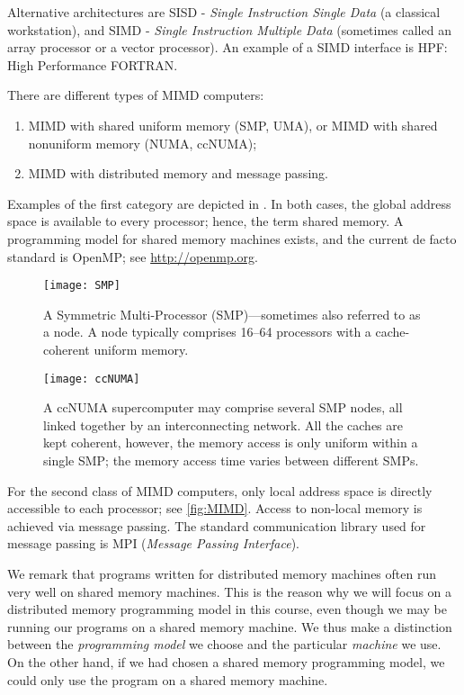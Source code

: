 Alternative architectures are SISD - \emph{Single Instruction Single Data} (a
classical workstation), and SIMD - \emph{Single Instruction Multiple Data}
(sometimes called an array processor or a vector processor). An example of a
SIMD interface is HPF: High Performance FORTRAN.

There are different types of MIMD computers:
\begin{enumerate}
\item MIMD with shared uniform memory (SMP, UMA), or MIMD with shared nonuniform
  memory (NUMA, ccNUMA);
\item MIMD with distributed memory and message passing.
\end{enumerate}

Examples of the first category are depicted in . In
both cases, the global address space is available to every processor; hence, the
term shared memory. A programming model for shared memory machines exists, and
the current de facto standard is OpenMP; see \url{http://openmp.org}.

\begin{figure}[htbp]
  \begin{center}
    \texttt{[image: SMP]}
  \end{center}
  \caption{
    A Symmetric Multi-Processor (SMP)---sometimes also referred to as a node. A
    node typically comprises 16--64 processors with a cache-coherent uniform
    memory.
  }
  \label{fig:SMP}
\end{figure}

\begin{figure}[htbp]
  \begin{center}
    \texttt{[image: ccNUMA]}
  \end{center}
  \caption{
    A ccNUMA supercomputer may comprise several SMP nodes, all linked together
    by an interconnecting network. All the caches are kept coherent, however,
    the memory access is only uniform within a single SMP; the memory access
    time varies between different SMPs.
  }
  \label{fig:ccNUMA}
\end{figure}

For the second class of MIMD computers, only local address space is directly
accessible to each processor; see \autoref{fig:MIMD}. Access to non-local memory
is achieved via message passing. The standard communication library used for
message passing is MPI (\emph{Message Passing Interface}).

We remark that programs written for distributed memory machines often run very
well on shared memory machines. This is the reason why we will focus on a
distributed memory programming model in this course, even though we may be
running our programs on a shared memory machine. We thus make a distinction
between the \emph{programming model} we choose and the particular \emph
{machine} we use. On the other hand, if we had chosen a shared memory
programming model, we could only use the program on a shared memory machine.

